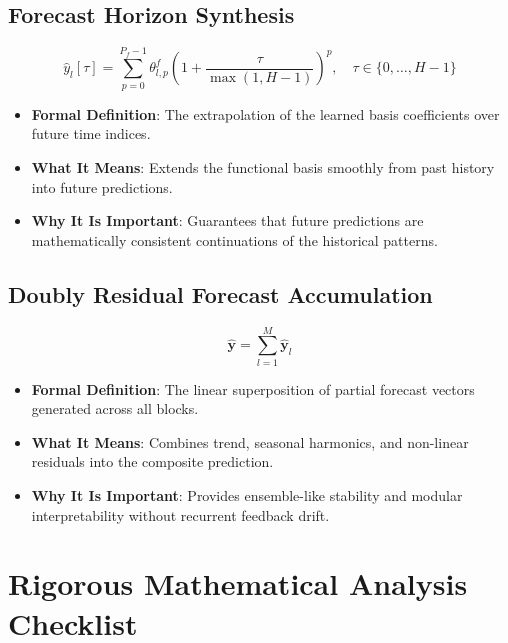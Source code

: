 \documentclass[11pt,a4paper]{article}
\theoremstyle{definition}
\begin{document}
\subsection{Forecast Horizon Synthesis}
{\boldmath
\begin{equation}
\widehat{y}_l[\tau] = \sum_{p=0}^{P_f-1} \theta_{l, p}^f \left( 1 + \frac{\tau}{\max(1, H-1)} \right)^p, \quad \tau \in \{0, \dots, H-1\}
\end{equation}
}
\begin{itemize}
    \item \textbf{Formal Definition}: The extrapolation of the learned basis coefficients over future time indices.
    \item \textbf{What It Means}: Extends the functional basis smoothly from past history into future predictions.
    \item \textbf{Why It Is Important}: Guarantees that future predictions are mathematically consistent continuations of the historical patterns.
\end{itemize}

\subsection{Doubly Residual Forecast Accumulation}
{\boldmath
\begin{equation}
\widehat{\mathbf{y}} = \sum_{l=1}^M \widehat{\mathbf{y}}_l
\end{equation}
}
\begin{itemize}
    \item \textbf{Formal Definition}: The linear superposition of partial forecast vectors generated across all blocks.
    \item \textbf{What It Means}: Combines trend, seasonal harmonics, and non-linear residuals into the composite prediction.
    \item \textbf{Why It Is Important}: Provides ensemble-like stability and modular interpretability without recurrent feedback drift.
\end{itemize}

\section{Rigorous Mathematical Analysis Checklist}
\end{document}

